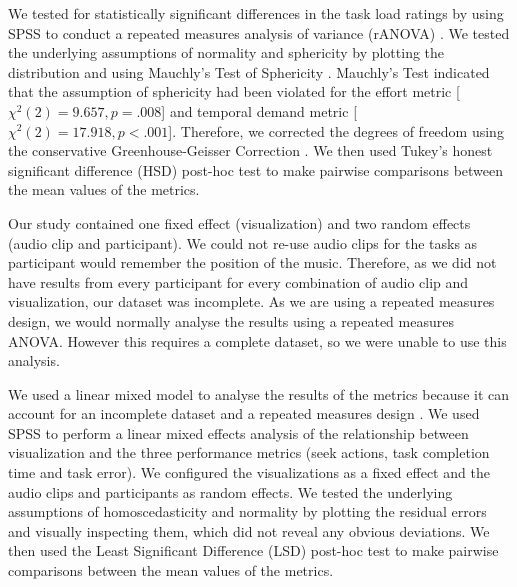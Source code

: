 
We tested for statistically significant differences in the task load ratings by using SPSS to conduct a repeated
measures analysis of variance (rANOVA) \citep[p.~409]{Shalabh2009}.  We tested the underlying assumptions of normality
and sphericity by plotting the distribution and using Mauchly's Test of Sphericity \citep[p.~415]{Shalabh2009}.
Mauchly's Test indicated that the assumption of sphericity had been violated for the effort metric [$\chi^2(2) = 9.657,
p=.008$] and temporal demand metric [$\chi^2(2) = 17.918, p<.001$]. Therefore, we corrected the degrees of freedom
using the conservative Greenhouse-Geisser Correction \citep[p.~416]{Shalabh2009}.  We then used Tukey's honest
significant difference (HSD) post-hoc test \citep[p.~139]{Shalabh2009} to make pairwise comparisons between the mean
values of the metrics.

Our study contained one fixed effect (visualization) and two random effects (audio clip and participant).  We could not
re-use audio clips for the tasks as participant would remember the position of the music.  Therefore, as we did not
have results from every participant for every combination of audio clip and visualization, our dataset was incomplete.
As we are using a repeated measures design, we would normally analyse the results using a repeated measures ANOVA.
However this requires a complete dataset, so we were unable to use this analysis.

We used a linear mixed model to analyse the results of the metrics because it can account for an incomplete dataset and
a repeated measures design \citep{Gueorguieva2004}.  We used SPSS to perform a linear mixed effects analysis
\citep[p.~274]{Shalabh2009} of the relationship between visualization and the three performance metrics (seek actions,
task completion time and task error).  We configured the visualizations as a fixed effect and the audio clips and
participants as random effects. We tested the underlying assumptions of homoscedasticity and normality by plotting the
residual errors and visually inspecting them, which did not reveal any obvious deviations.
We then used the Least Significant Difference (LSD) post-hoc test \citep[p.~137]{Shalabh2009} to make pairwise
comparisons between the mean values of the metrics.

